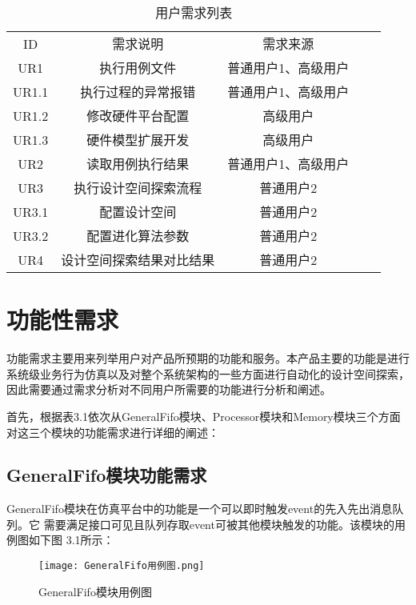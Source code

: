\begin{table}[htb]
    \centering\normalsize
    \caption{用户需求列表}
    \begin{tabular}{|c|c|c|ll}
    \cline{1-3}
    ID    & 需求说明         & 需求来源       &  &  \\ \cline{1-3}
    UR1   & 执行用例文件       & 普通用户1、高级用户 &  &  \\ \cline{1-3}
    UR1.1 & 执行过程的异常报错    & 普通用户1、高级用户 &  &  \\ \cline{1-3}
    UR1.2 & 修改硬件平台配置     & 高级用户       &  &  \\ \cline{1-3}
    UR1.3 & 硬件模型扩展开发     & 高级用户       &  &  \\ \cline{1-3}
    UR2   & 读取用例执行结果     & 普通用户1、高级用户 &  &  \\ \cline{1-3}
    UR3   & 执行设计空间探索流程   & 普通用户2      &  &  \\ \cline{1-3}
    UR3.1 & 配置设计空间       & 普通用户2      &  &  \\ \cline{1-3}
    UR3.2 & 配置进化算法参数     & 普通用户2      &  &  \\ \cline{1-3}
    UR4   & 设计空间探索结果对比结果 & 普通用户2      &  &  \\ \cline{1-3}
    \end{tabular}
    \end{table}

\section{功能性需求}
功能需求主要用来列举用户对产品所预期的功能和服务。本产品主要的功能是进行
系统级业务行为仿真以及对整个系统架构的一些方面进行自动化的设计空间探索，
因此需要通过需求分析对不同用户所需要的功能进行分析和阐述。

首先，根据表3.1依次从GeneralFifo模块、Processor模块和Memory模块三个方面
对这三个模块的功能需求进行详细的阐述：

\subsection{GeneralFifo模块功能需求}
GeneralFifo模块在仿真平台中的功能是一个可以即时触发event的先入先出消息队列。它
需要满足接口可见且队列存取event可被其他模块触发的功能。该模块的用例图如下图
3.1所示：

\begin{figure}[h]
    \centering
    \texttt{[image: GeneralFifo用例图.png]}
    \caption{GeneralFifo模块用例图}
    \label{fig:badge}
\end{figure}

